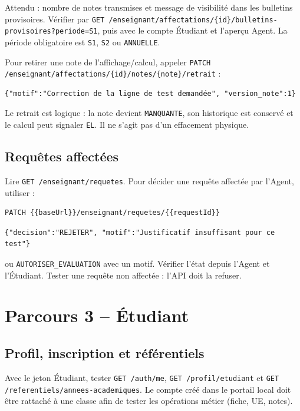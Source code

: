 \documentclass[10pt,a4paper]{article}
\newcommand{\method}[1]{\texttt{\small #1}}
\begin{document}
Attendu : nombre de notes transmises et message de visibilité dans les bulletins provisoires. Vérifier par \method{GET /enseignant/affectations/\{id\}/bulletins-provisoires?periode=S1}, puis avec le compte Étudiant et l’aperçu Agent. La période obligatoire est \texttt{S1}, \texttt{S2} ou \texttt{ANNUELLE}.

Pour retirer une note de l’affichage/calcul, appeler \method{PATCH /enseignant/affectations/\{id\}/notes/\{note\}/retrait} :
\begin{lstlisting}
{"motif":"Correction de la ligne de test demandée", "version_note":1}
\end{lstlisting}

Le retrait est logique : la note devient \texttt{MANQUANTE}, son historique est conservé et le calcul peut signaler \texttt{EL}. Il ne s’agit pas d’un effacement physique.

\subsection{Requêtes affectées}

Lire \method{GET /enseignant/requetes}. Pour décider une requête affectée par l’Agent, utiliser :
\begin{lstlisting}
PATCH {{baseUrl}}/enseignant/requetes/{{requestId}}
\end{lstlisting}
\begin{lstlisting}
{"decision":"REJETER", "motif":"Justificatif insuffisant pour ce test"}
\end{lstlisting}

ou \texttt{AUTORISER\_EVALUATION} avec un motif. Vérifier l’état depuis l’Agent et l’Étudiant. Tester une requête non affectée : l’API doit la refuser.

\section{Parcours 3 -- Étudiant}

\subsection{Profil, inscription et référentiels}

Avec le jeton Étudiant, tester \method{GET /auth/me}, \method{GET /profil/etudiant} et \method{GET /referentiels/annees-academiques}. Le compte créé dans le portail local doit être rattaché à une classe afin de tester les opérations métier (fiche, UE, notes).
\end{document}
